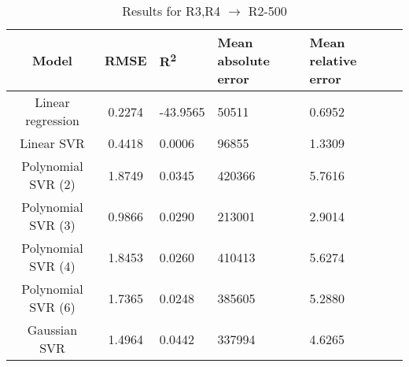 \begin{table}[H]
\centering
\begin{adjustbox}{center}
\begin{tabular}{c | c M{1.2cm} M{2.5cm} M{2.5cm} M{1.8cm}}
Model & RMSE & R\textsuperscript{2} & Mean absolute error & Mean relative error \tabularnewline
\hline
Linear regression & 0.2274 & -43.9565 &  50511 & 0.6952 \\
Linear SVR & 0.4418 & 0.0006 &  96855 & 1.3309 \\
Polynomial SVR (2) & 1.8749 & 0.0345 & 420366 & 5.7616 \\
Polynomial SVR (3) & 0.9866 & 0.0290 & 213001 & 2.9014 \\
Polynomial SVR (4) & 1.8453 & 0.0260 & 410413 & 5.6274 \\
Polynomial SVR (6) & 1.7365 & 0.0248 & 385605 & 5.2880 \\
Gaussian SVR & 1.4964 & 0.0442 & 337994 & 4.6265 \\
\end{tabular}
\end{adjustbox}
\\
\caption{Results for R3,R4 $\rightarrow$ R2-500}
\label{tab:coreonly_linear_R3,R4_R2_500}
\end{table}
